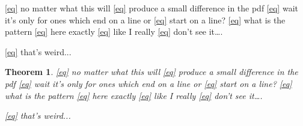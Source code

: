\documentclass{amsart}
\newtheorem{thm}{Theorem}
\begin{document}
\eqref{eq} no matter what this will \eqref{eq} produce a small difference in the pdf \eqref{eq} wait it's only for ones which end on a line or \eqref{eq}
start on a line? \eqref{eq} what is the pattern \eqref{eq} here exactly \eqref{eq} like I really \eqref{eq} don't see it\dots.

\eqref{eq} that's weird...

\begin{thm}
  \eqref{eq} no matter what this will \eqref{eq} produce a small difference in the pdf \eqref{eq} wait it's only for ones which end on a line or \eqref{eq}
start on a line? \eqref{eq} what is the pattern \eqref{eq} here exactly \eqref{eq} like I really \eqref{eq} don't see it\dots.

\eqref{eq} that's weird...
\end{thm}
\end{document}
